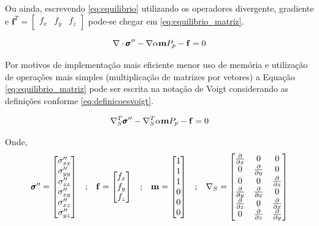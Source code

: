 Ou ainda, escrevendo \eqref{eq:equilibrio} utilizando os operadores divergente, gradiente e $\mathbf{f}^T=\begin{bmatrix}f_x & f_y & f_z\end{bmatrix}$ pode-se chegar em
\eqref{eq:equilibrio_matriz}.

\begin{equation}
\label{eq:equilibrio_matriz}
\nabla \cdot \stef - \nabla \alpha \mathbf{m} P_p - \mathbf{f} = 0
\end{equation}

Por motivos de implementação mais eficiente menor uso de memória e utilização de operações mais simples (multiplicação de matrizes por vetores) a Equação \eqref{eq:equilibrio_matriz} pode ser escrita na notação de Voigt considerando as definições conforme \eqref{eq:definicoesvoigt}.

\begin{equation}
\label{eq:equilibrio_final}
\sopnabla^T \stef - \sopnabla^T\alpha \mathbf{m}  P_p - \mathbf{f} = 0
\end{equation}

Onde,
\begin{equation}
\begin{matrix}\label{eq:definicoesvoigt}
\pmb{\sigma}^{\prime\prime} = \begin{bmatrix}
\sigma^{\prime\prime}_{xx}
\\
\sigma^{\prime\prime}_{yy}
\\
\sigma^{\prime\prime}_{zz}
\\
\sigma^{\prime\prime}_{xy}
\\
\sigma^{\prime\prime}_{xz}
\\
\sigma^{\prime\prime}_{yz}
\end{bmatrix}
&

;

&

\mathbf{f} = \begin{bmatrix}
f_{x}
\\
f_{y}
\\
f_{z}
\end{bmatrix}
&
;
&

\mathbf{m} = \begin{bmatrix} 1 \\ 1 \\ 1 \\ 0 \\ 0 \\ 0\end{bmatrix}

&
;

&
\nabla_S = \begin{bmatrix} \frac{\partial { }}{\partial x} & 0 & 0 \\ 0 & \frac{\partial { }}{\partial y} & 0 \\ 0 & 0 & \frac{\partial { }}{\partial z} \\ \frac{\partial { }}{\partial y} & \frac{\partial { }}{\partial x} & 0 \\ \frac{\partial { }}{\partial z} & 0 & \frac{\partial { }}{\partial x} \\ 0 & \frac{\partial { }}{\partial z} & \frac{\partial { }}{\partial y} \end{bmatrix}
\end{matrix}
\end{equation}




